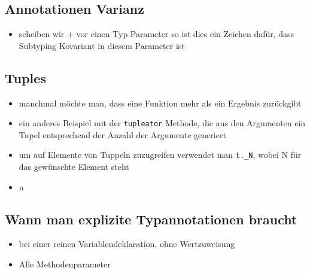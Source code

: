 \subsection{Annotationen Varianz}
\begin{itemize}
  \item scheiben wir + vor einen Typ Parameter so ist dies ein Zeichen dafür,
  dass Subtyping Kovariant in diesem Parameter ist
  
  
\end{itemize}


\subsection{Tuples}
\begin{itemize}
  \item manchmal möchte man, dass eine Funktion mehr als ein Ergebnis
  zurückgibt
  
  
  \item ein anderes Beispiel mit der \texttt{tupleator} Methode, die aus den
  Argumenten ein Tupel entsprechend der Anzahl der Argumente generiert
  
  
  
  \item um auf Elemente von Tuppeln zuzugreifen verwendet man
  \texttt{t.\_N}, wobei N für das gewünschte Element steht
  \item n
\end{itemize}


\subsection{Wann man explizite Typannotationen braucht}
\begin{itemize}
  \item bei einer reinen Variablendeklaration, ohne Wertzuweisung
  \item Alle Methodenparameter
\end{itemize}
\pagebreak


